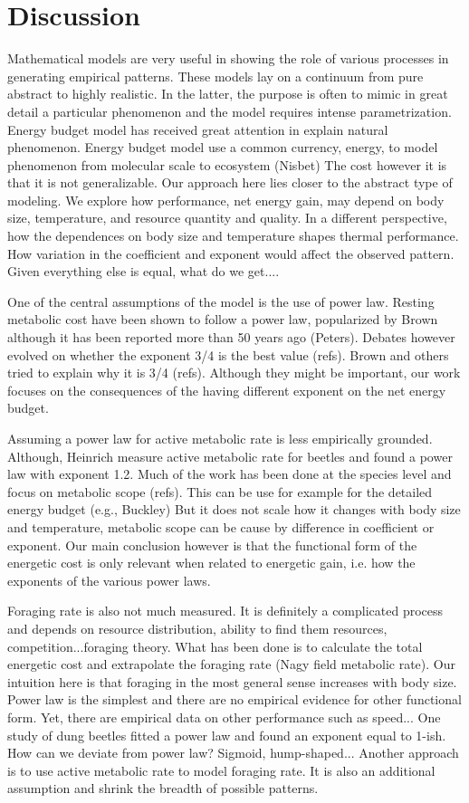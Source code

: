 \section*{Discussion}
Mathematical models are very useful in showing the role of various processes in generating empirical patterns.
These models lay on a continuum from pure abstract to highly realistic.
In the latter, the purpose is often to mimic in great detail a particular phenomenon and the model requires intense parametrization.
Energy budget model has received great attention in explain natural phenomenon.
Energy budget model use a common currency, energy, to model phenomenon from molecular scale to ecosystem (Nisbet)
The cost however it is that it is not generalizable.
Our approach here lies closer to the abstract type of modeling.
We explore how performance, net energy gain, may depend on body size, temperature, and resource quantity and quality. 
In a different perspective, how the dependences on body size and temperature shapes thermal performance.
How variation in the coefficient and exponent would affect the observed pattern.
Given everything else is equal, what do we get....

One of the central assumptions of the model is the use of power law.
Resting metabolic cost have been shown to follow a power law, popularized by Brown although it has been reported more than 50 years ago (Peters).
Debates however evolved on whether the exponent 3/4 is the best value (refs).
Brown and others tried to explain why it is 3/4 (refs).
Although they might be important, our work focuses on the consequences of the having different exponent on the net energy budget. 

Assuming a power law for active metabolic rate is less empirically grounded.
Although, Heinrich measure active metabolic rate for beetles and found a power law with exponent 1.2.
Much of the work has been done at the  species level and focus on metabolic scope (refs).
This can be use for example for the detailed energy budget (e.g., Buckley)
But it does not scale how it changes with body size and temperature, metabolic scope can be cause by difference in coefficient or exponent.
Our main conclusion however is that the functional form of the energetic cost is only relevant when related to energetic gain, i.e. how the exponents of the various power laws.  
 
Foraging rate is also not much measured.
It is definitely a complicated process and depends on resource distribution, ability to find them resources, competition...foraging theory.
What has been done is to calculate the total energetic cost and extrapolate the foraging rate (Nagy field metabolic rate).
Our intuition here is that foraging in the most general sense increases with body size.
Power law is the simplest and there are no empirical evidence for other functional form.
Yet, there are empirical data on other performance such as speed...
One study of dung beetles fitted a power law and found an exponent equal to 1-ish.
How can we deviate from power law? 
Sigmoid, hump-shaped...
Another approach is to use active metabolic rate to model foraging rate.
It is also an additional assumption and shrink the breadth of possible patterns.

